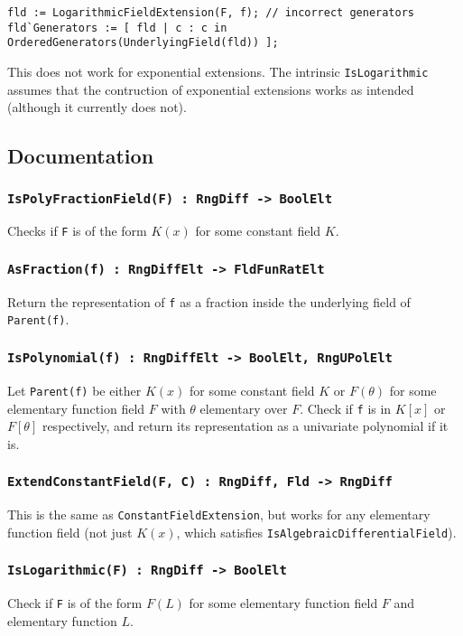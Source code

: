 \documentclass{article}
\theoremstyle{plain}
\theoremstyle{definition}
\begin{document}
\begin{lstlisting}[numbers=none]
fld := LogarithmicFieldExtension(F, f); // incorrect generators
fld`Generators := [ fld | c : c in OrderedGenerators(UnderlyingField(fld)) ];
\end{lstlisting}

This does not work for exponential extensions. The intrinsic
\lstinline{IsLogarithmic} assumes that the contruction of exponential extensions 
works as intended (although it currently does not).

\subsection{Documentation}

\subsubsection*{\lstinline{IsPolyFractionField(F) : RngDiff -> BoolElt}}
Checks if \lstinline{F} is of the form $K(x)$ for some constant field $K$.

\subsubsection*{\lstinline{AsFraction(f) : RngDiffElt -> FldFunRatElt}}
Return the representation of \lstinline{f} as a fraction inside the underlying
field of \lstinline{Parent(f)}.

\subsubsection*{\lstinline{IsPolynomial(f) : RngDiffElt -> BoolElt, RngUPolElt}}
Let \lstinline{Parent(f)} be either $K(x)$ for some constant field $K$ or
$F(\theta)$ for some elementary function field $F$ with $\theta$ elementary over
$F$. Check if \lstinline{f} is in $K[x]$ or $F[\theta]$ respectively, and return
its representation as a univariate polynomial if it is.

\subsubsection*{\lstinline{ExtendConstantField(F, C) : RngDiff, Fld -> RngDiff}}
This is the same as \lstinline{ConstantFieldExtension}, but works for any
elementary function field (not just $K(x)$, which satisfies
\lstinline{IsAlgebraicDifferentialField}).


\subsubsection*{\lstinline{IsLogarithmic(F) : RngDiff -> BoolElt}}
Check if \lstinline{F} is of the form $F(L)$ for some elementary function field
$F$ and elementary function $L$.
\end{document}
